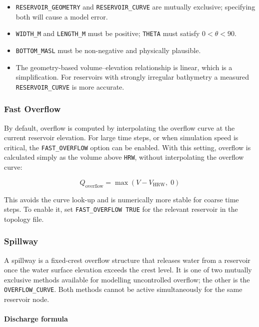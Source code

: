 \documentclass[a4paper, 12pt]{report}
\begin{document}
\begin{itemize}
	\item \texttt{RESERVOIR\_GEOMETRY} and \texttt{RESERVOIR\_CURVE} are mutually exclusive; specifying both will cause a model error.
	\item \texttt{WIDTH\_M} and \texttt{LENGTH\_M} must be positive; \texttt{THETA} must satisfy $0 < \theta < 90$.
	\item \texttt{BOTTOM\_MASL} must be non-negative and physically plausible.
	\item The geometry-based volume--elevation relationship is linear, which is a simplification. For reservoirs with strongly irregular bathymetry a measured \texttt{RESERVOIR\_CURVE} is more accurate.
\end{itemize}




	\subsubsection{Fast Overflow}
	\label{subsubsec:fast_overflow}

	By default, overflow is computed by interpolating the overflow curve at the current reservoir
	elevation. For large time steps, or when simulation speed is critical, the \texttt{FAST\_OVERFLOW}
	option can be enabled. With this setting, overflow is calculated simply as the volume above
	\texttt{HRW}, without interpolating the overflow curve:

	$$Q_\mathrm{overflow} = \max\!\left(V - V_\mathrm{HRW},\; 0\right)$$

	This avoids the curve look-up and is numerically more stable for coarse time steps. To enable
	it, set \texttt{FAST\_OVERFLOW TRUE} for the relevant reservoir in the topology file.




	\subsubsection{Spillway}

	A spillway is a fixed-crest overflow structure that releases water from a reservoir once the water surface elevation exceeds the crest level. It is one of two mutually exclusive methods available for modelling uncontrolled overflow; the other is the \texttt{OVERFLOW\_CURVE}. Both methods cannot be active simultaneously for the same reservoir node.

	\paragraph{Discharge formula}
\end{document}
